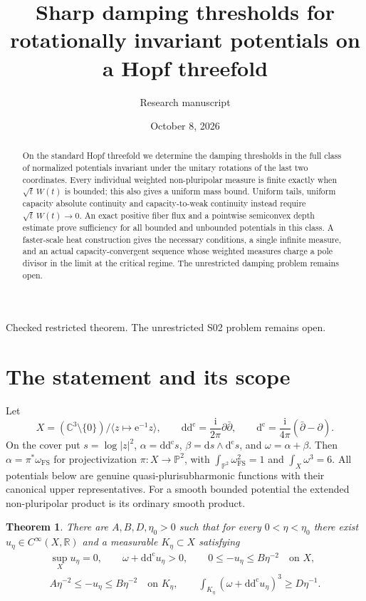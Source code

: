 \documentclass[11pt]{article}
\title{Sharp damping thresholds for rotationally invariant\newline
potentials on a Hopf threefold}
\author{Research manuscript}
\date{October 8, 2026}
\newtheorem{theorem}{Theorem}
\theoremstyle{remark}
\newcommand{\ddc}{\mathrm{d}\mathrm{d}^{\mathrm c}}
\newcommand{\dc}{\mathrm{d}^{\mathrm c}}
\newcommand{\C}{\mathbb C}
\newcommand{\R}{\mathbb R}
\newcommand{\Pp}{\mathbb P}
\newcommand{\FS}{\mathrm{FS}}
\begin{document}
\maketitle
\begin{center}
\small Checked restricted theorem. The unrestricted S02 problem remains open.
\end{center}
\begin{abstract}
On the standard Hopf threefold we determine the damping thresholds in the
full class of normalized potentials invariant under the unitary rotations
of the last two coordinates. Every individual weighted non-pluripolar
measure is finite exactly when $\sqrt t\,W(t)$ is bounded; this also gives
a uniform mass bound. Uniform tails, uniform capacity absolute continuity
and capacity-to-weak continuity instead require $\sqrt t\,W(t)\to0$.
An exact positive fiber flux and a pointwise semiconvex depth estimate prove
sufficiency for all bounded and unbounded potentials in this class. A
faster-scale heat construction gives the necessary conditions, a single
infinite measure, and an actual capacity-convergent sequence whose weighted
measures charge a pole divisor in the limit at the critical regime.
The unrestricted damping problem remains open.
\end{abstract}

\section{The statement and its scope}
Let
\[
 X=(\C^3\setminus\{0\})/\langle z\mapsto \mathrm e^{-1}z\rangle,
 \qquad \ddc=\frac{\mathrm i}{2\pi}\partial\bar\partial,
 \qquad \dc=\frac{\mathrm i}{4\pi}(\bar\partial-\partial).
\]
On the cover put $s=\log|z|^2$, $\alpha=\ddc s$,
$\beta=\mathrm ds\wedge\dc s$, and $\omega=\alpha+\beta$.
Then $\alpha=\pi^*\omega_{\FS}$ for projectivization
$\pi:X\to\Pp^2$, with $\int_{\Pp^2}\omega_{\FS}^2=1$ and
$\int_X\omega^3=6$. All potentials below are genuine quasi-plurisubharmonic
functions with their canonical upper representatives. For a smooth bounded
potential the extended non-pluripolar product is its ordinary smooth product.

\begin{theorem}\label{thm:core}
There are $A,B,D,\eta_0>0$ such that for every $0<\eta<\eta_0$ there exist
$u_\eta\in C^\infty(X,\R)$ and a measurable $K_\eta\subset X$ satisfying
\begin{gather*}
 \sup_Xu_\eta=0,\qquad \omega+\ddc u_\eta>0,
 \qquad 0\leq-u_\eta\leq B\eta^{-2}\quad\text{on }X,\\
 A\eta^{-2}\leq-u_\eta\leq B\eta^{-2}\quad\text{on }K_\eta,
 \qquad
 \int_{K_\eta}(\omega+\ddc u_\eta)^3\geq D\eta^{-1}.
\end{gather*}
\end{theorem}
\end{document}
